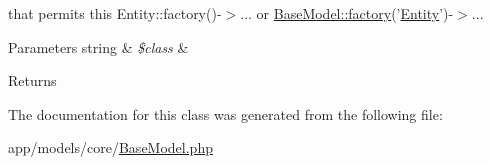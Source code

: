 that permits this Entity\-::factory()-\/$>$... or \hyperlink{classapp_1_1models_1_1core_1_1_base_model_a23d019365c40167af9d7bff43adaddfa}{Base\-Model\-::factory}('\hyperlink{namespace_entity}{Entity}')-\/$>$...


\begin{DoxyParams}[1]{Parameters}
string & {\em \$class} & \\
\hline
\end{DoxyParams}
\begin{DoxyReturn}{Returns}

\end{DoxyReturn}


The documentation for this class was generated from the following file\-:\begin{DoxyCompactItemize}
\item 
app/models/core/\hyperlink{_base_model_8php}{Base\-Model.\-php}\end{DoxyCompactItemize}
